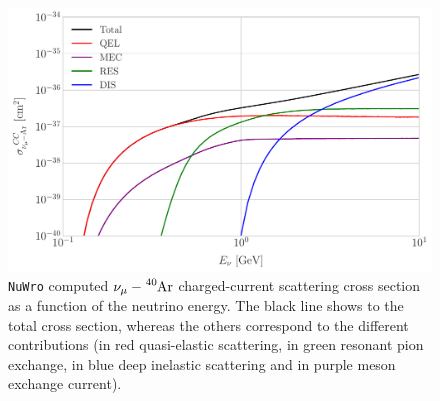 \begin{figure}[t]
	\centering
	\includegraphics[width=0.9\linewidth]{Images/DM_Analysis/nu_Ar_xsection}
	\caption[\texttt{NuWro} computed $\nu_{\mu}-\ce{^{40}Ar}$ charged-current scattering cross section as a function of the neutrino energy.]{\texttt{NuWro} computed $\nu_{\mu}-\ce{^{40}Ar}$ charged-current scattering cross section as a function of the neutrino energy. The black line shows to the total cross section, whereas the others correspond to the different contributions (in red quasi-elastic scattering, in green resonant pion exchange, in blue deep inelastic scattering and in purple meson exchange current).}
	\label{fig:nu_Ar_xsection}
\end{figure}

